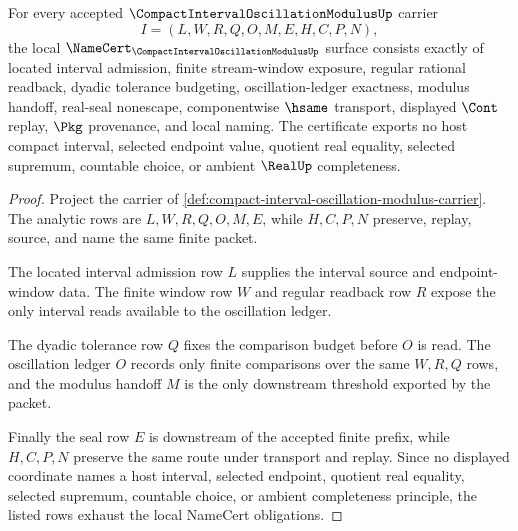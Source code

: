 \begin{theorem}
\label{thm:compact-interval-oscillation-modulus-namecert-obligations}
For every accepted $\CompactIntervalOscillationModulusUp$ carrier
$$
I=(L,W,R,Q,O,M,E,H,C,P,N),
$$
the local $\NameCert_{\CompactIntervalOscillationModulusUp}$ surface consists exactly of located interval admission, finite stream-window exposure, regular rational readback, dyadic tolerance budgeting, oscillation-ledger exactness, modulus handoff, real-seal nonescape, componentwise $\hsame$ transport, displayed $\Cont$ replay, $\Pkg$ provenance, and local naming. The certificate exports no host compact interval, selected endpoint value, quotient real equality, selected supremum, countable choice, or ambient $\RealUp$ completeness.
\end{theorem}
\begin{proof}
Project the carrier of \autoref{def:compact-interval-oscillation-modulus-carrier}. The analytic rows are $L,W,R,Q,O,M,E$, while $H,C,P,N$ preserve, replay, source, and name the same finite packet.

The located interval admission row $L$ supplies the interval source and endpoint-window data. The finite window row $W$ and regular readback row $R$ expose the only interval reads available to the oscillation ledger.

The dyadic tolerance row $Q$ fixes the comparison budget before $O$ is read. The oscillation ledger $O$ records only finite comparisons over the same $W,R,Q$ rows, and the modulus handoff $M$ is the only downstream threshold exported by the packet.

Finally the seal row $E$ is downstream of the accepted finite prefix, while $H,C,P,N$ preserve the same route under transport and replay. Since no displayed coordinate names a host interval, selected endpoint, quotient real equality, selected supremum, countable choice, or ambient completeness principle, the listed rows exhaust the local NameCert obligations.
\end{proof}

